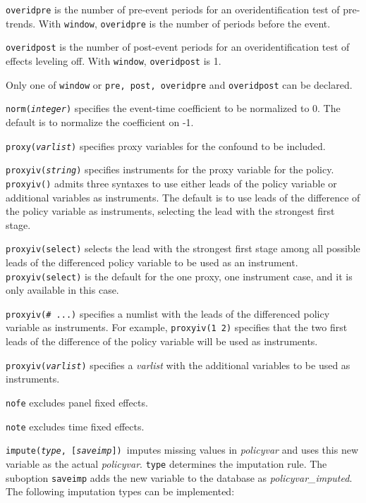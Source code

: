 \documentclass[bib]{./sty/statapress}
\begin{document}
\morehangpara
{\tt overidpre} is the number of pre-event periods for an overidentification test of pre-trends. With {\tt window}, {\tt overidpre} is the number of periods before the event.

\morehangpara
{\tt overidpost} is the number of post-event periods for an overidentification test of effects leveling off. With {\tt window}, {\tt overidpost} is 1.

\hangpara
Only one of {\tt window} or {\tt pre, post, overidpre} and {\tt overidpost} can be declared.

\hangpara
{\tt norm({\it integer})} specifies the event-time coefficient to be normalized to 0. The default is to normalize the coefficient on -1.

\hangpara
{\tt proxy({\it varlist})} specifies proxy variables for the confound to be included.

\hangpara
{\tt proxyiv({\it string})} specifies instruments for the proxy variable for the policy.
{\tt proxyiv()} admits three syntaxes to use either leads of the policy variable or additional variables as instruments.
The default is to use leads of the difference of the policy variable as instruments, selecting the lead with the strongest first stage.

\morehangpara
{\tt proxyiv(select)} selects the lead with the strongest first stage among all possible leads of the differenced policy variable to be used as an instrument.
{\tt proxyiv(select)} is the default for the one proxy, one instrument case, and it is only available in this case.

\morehangpara
{\tt proxyiv(\# ...)} specifies a numlist with the leads of the differenced policy variable as instruments. For example, {\tt proxyiv(1 2)} specifies that the two first leads of the difference of the policy variable will be used as instruments.

\morehangpara
{\tt proxyiv({\it varlist})} specifies a \textit{varlist} with the additional variables to be used as instruments.

\hangpara
{\tt nofe} excludes panel fixed effects.

\hangpara
{\tt note} excludes time fixed effects.

\hangpara
{\tt impute({\it type}, [{\it saveimp}]) }imputes missing values in {\it policyvar} and uses this new variable as the actual {\it policyvar}. {\tt type} determines the imputation rule. The suboption {\tt saveimp} adds the new variable to the database as {\it policyvar\_imputed}. The following imputation types can be implemented:
\end{document}

